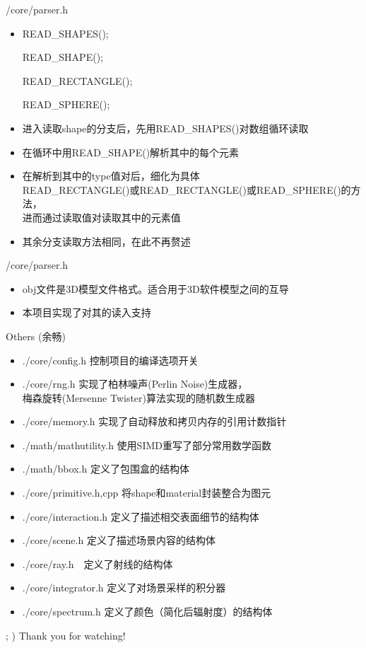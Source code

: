 \documentclass{beamer}
\begin{document}
\begin{frame} {/core/parser.h}
\begin{itemize} [<+->]
\item \begin{semiverbatim}  READ\_SHAPES(); \end{semiverbatim}
\begin{semiverbatim} READ\_SHAPE(); \end{semiverbatim}
\begin{semiverbatim} READ\_RECTANGLE(); \end{semiverbatim}
\begin{semiverbatim} READ\_SPHERE(); \end{semiverbatim}
\item 进入读取shape的分支后，先用READ\_SHAPES()对数组循环读取
\item 在循环中用READ\_SHAPE()解析其中的每个元素
\item 在解析到其中的type值对后，细化为具体 \\ READ\_RECTANGLE()或READ\_RECTANGLE()或READ\_SPHERE()的方法， \\ 进而通过读取值对读取其中的元素值
\item 其余分支读取方法相同，在此不再赘述
\end{itemize}
\end{frame}

\begin{frame} {/core/parser.h}
\begin{itemize}
\item obj文件是3D模型文件格式。适合用于3D软件模型之间的互导
\item 本项目实现了对其的读入支持
\end{itemize}
\end{frame}

\begin{frame} {Others (余畅)}
\begin{itemize} [<+->]

\item ./core/config.h 控制项目的编译选项开关
\item ./core/rng.h 实现了柏林噪声(Perlin Noise)生成器，\\ 梅森旋转(Mersenne Twister)算法实现的随机数生成器
\item ./core/memory.h 实现了自动释放和拷贝内存的引用计数指针
\item ./math/mathutility.h 使用SIMD重写了部分常用数学函数
\item ./math/bbox.h 定义了包围盒的结构体
\item ./core/primitive.h,cpp 将shape和material封装整合为图元
\item ./core/interaction.h 定义了描述相交表面细节的结构体
\item ./core/scene.h 定义了描述场景内容的结构体
\item ./core/ray.h　定义了射线的结构体
\item ./core/integrator.h 定义了对场景采样的积分器
\item ./core/spectrum.h 定义了颜色（简化后辐射度）的结构体
\end{itemize}
\end{frame}

\begin{frame} {; )}
Thank you for watching!
\end{frame}
\end{document}
